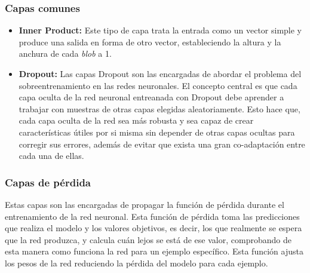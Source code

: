 \documentclass[a4paper, 12pt, spanish, chapterprefix, numbers=noenddot]{book}
\begin{document}
\begin{comment}
\subsubsection{Capas recurrentes}

\begin{itemize}
\item \textbf{Recurrent}
\item \textbf{RRNN}
\item \textbf{Long-Short Term Memory (LSTM)}
\end{itemize}
\end{comment}

\subsubsection{Capas comunes}

\begin{itemize}
\item \textbf{Inner Product:} Este tipo de capa trata la entrada como un vector simple y produce una salida en forma de otro vector, estableciendo la altura y la anchura de cada \textit{blob} a 1.
\item \textbf{Dropout:} Las capas Dropout son las encargadas de abordar el problema del sobreentrenamiento en las redes neuronales. El concepto central es que cada capa oculta de la red neuronal entreanada con Dropout debe aprender a trabajar con muestras de otras capas elegidas aleatoriamente. Esto hace que, cada capa oculta de la red sea más robusta y sea capaz de crear características útiles por si misma sin depender de otras capas ocultas para corregir sus errores, además de evitar que exista una gran co-adaptación entre cada una de ellas.
\begin{comment}
\item \textbf{Embed}
\end{comment}
\end{itemize}

\subsubsection{Capas de pérdida}

Estas capas son las encargadas de propagar la función de pérdida durante el entrenamiento de la red neuronal. Esta función de pérdida toma las predicciones que realiza el modelo y los valores objetivos, es decir, los que realmente se espera que la red produzca, y calcula cuán lejos se está de ese valor, comprobando de esta manera como funciona la red para un ejemplo específico. Esta función ajusta los pesos de la red reduciendo la pérdida del modelo para cada ejemplo.\\
\end{document}
